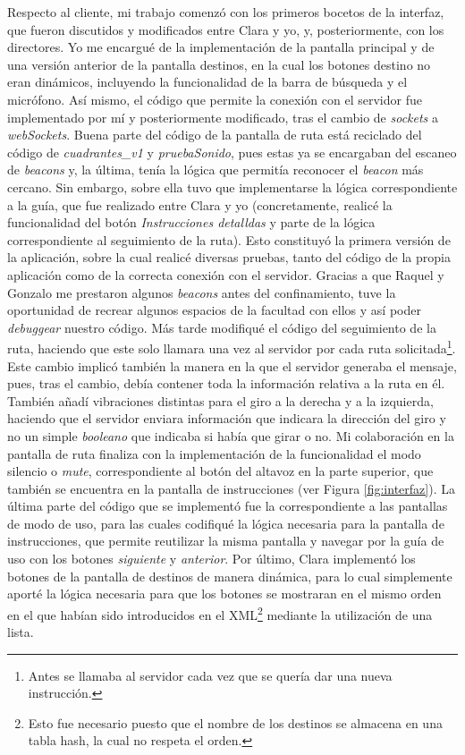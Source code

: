 Respecto al cliente, mi trabajo comenzó con los primeros bocetos de la interfaz, que fueron discutidos y modificados entre Clara y yo, y, posteriormente, con los directores. Yo me encargué de la implementación de la pantalla principal y de una versión anterior de la pantalla destinos, en la cual los botones destino no eran dinámicos, incluyendo la funcionalidad de la barra de búsqueda y el micrófono. Así mismo, el código que permite la conexión con el servidor fue implementado por mí y posteriormente modificado, tras el cambio de \textit{sockets} a \textit{webSockets}. Buena parte del código de la pantalla de ruta está reciclado del código de \textit{cuadrantes\_v1} y \textit{pruebaSonido}, pues estas ya se encargaban del escaneo de \textit{beacons} y, la última, tenía la lógica que permitía reconocer el \textit{beacon} más cercano. Sin embargo, sobre ella tuvo que implementarse la lógica correspondiente a la guía, que fue realizado entre Clara y yo (concretamente, realicé la funcionalidad del botón \textit{Instrucciones detalldas} y parte de la lógica correspondiente al seguimiento de la ruta). Esto constituyó la primera versión de la aplicación, sobre la cual realicé diversas pruebas, tanto del código de la propia aplicación como de la correcta conexión con el servidor. Gracias a que Raquel y Gonzalo me prestaron algunos \textit{beacons} antes del confinamiento, tuve la oportunidad de recrear algunos espacios de la facultad con ellos y así poder \textit{debuggear} nuestro código. Más tarde modifiqué el código del seguimiento de la ruta, haciendo que este solo llamara una vez al servidor por cada ruta solicitada\footnote{Antes se llamaba al servidor cada vez que se quería dar una nueva instrucción.}. Este cambio implicó también la manera en la que el servidor generaba el mensaje, pues, tras el cambio, debía contener toda la información relativa a la ruta en él. También añadí vibraciones distintas para el giro a la derecha y a la izquierda, haciendo que el servidor enviara información que indicara la dirección del giro y no un simple \textit{booleano} que indicaba si había que girar o no. Mi colaboración en la pantalla de ruta finaliza con la implementación de la funcionalidad el modo silencio o \textit{mute}, correspondiente al botón del altavoz en la parte superior, que también se encuentra en la pantalla de instrucciones (ver Figura \ref{fig:interfaz}). La última parte del código que se implementó fue la correspondiente a las pantallas de modo de uso, para las cuales codifiqué la lógica necesaria para la pantalla de instrucciones, que permite reutilizar la misma pantalla y navegar por la guía de uso con los botones \textit{siguiente} y \textit{anterior}. Por último, Clara implementó los botones de la pantalla de destinos de manera dinámica, para lo cual simplemente aporté la lógica necesaria para que los botones se mostraran en el mismo orden en el que habían sido introducidos en el XML\footnote{Esto fue necesario puesto que el nombre de los destinos se almacena en una tabla hash, la cual no respeta el orden.} mediante la utilización de una lista.

